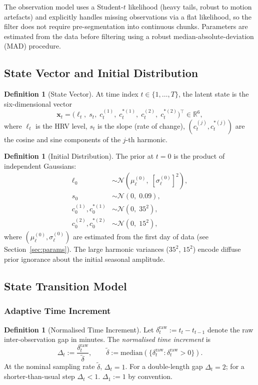 \documentclass[11pt, a4paper]{article}
\theoremstyle{plain}
\theoremstyle{definition}
\newtheorem{definition}[theorem]{Definition}
\newcommand{\R}{\mathbb{R}}
\newcommand{\N}{\mathcal{N}}
\newcommand{\bx}{\mathbf{x}}
\begin{document}
The observation model uses a Student-$t$ likelihood (heavy tails, robust to
motion artefacts) and explicitly handles missing observations via a flat
likelihood, so the filter does not require pre-segmentation into continuous
chunks. Parameters are estimated from the data before filtering using a
robust median-absolute-deviation (MAD) procedure.

\subsection{State Vector and Initial Distribution}

\begin{definition}[State Vector]
At time index $t \in \{1, \ldots, T\}$, the latent state is the
six-dimensional vector
\[
  \bx_t
  = \bigl(\ell_t,\; s_t,\; c_t^{(1)},\; c_t^{*(1)},\; c_t^{(2)},\; c_t^{*(2)}\bigr)^\top
  \in \R^6,
\]
where $\ell_t$ is the HRV level, $s_t$ is the slope (rate of change),
$(c_t^{(j)}, c_t^{*(j)})$ are the cosine and sine components of the $j$-th
harmonic.
\end{definition}

\begin{definition}[Initial Distribution]
The prior at $t = 0$ is the product of independent Gaussians:
\begin{align*}
  \ell_0 &\sim \N(\mu_\ell^{(0)},\; [\sigma_\ell^{(0)}]^2),\\
  s_0    &\sim \N(0,\; 0.09),\\
  c_0^{(1)}, c_0^{*(1)} &\sim \N(0,\; 35^2),\\
  c_0^{(2)}, c_0^{*(2)} &\sim \N(0,\; 15^2),
\end{align*}
where $(\mu_\ell^{(0)}, \sigma_\ell^{(0)})$ are estimated from the first
day of data (see Section~\ref{sec:params}). The large harmonic variances
($35^2$, $15^2$) encode diffuse prior ignorance about the initial seasonal
amplitude.
\end{definition}

\subsection{State Transition Model}

\subsubsection{Adaptive Time Increment}

\begin{definition}[Normalised Time Increment]
Let $\delta_t^{\mathrm{raw}} := t_t - t_{t-1}$ denote the raw inter-observation
gap in minutes. The \emph{normalised time increment} is
\[
  \Delta_t := \frac{\delta_t^{\mathrm{raw}}}{\tilde\delta},
  \qquad \tilde\delta := \mathrm{median}\!\left(\{\delta_t^{\mathrm{raw}} : \delta_t^{\mathrm{raw}} > 0\}\right).
\]
At the nominal sampling rate $\tilde\delta$, $\Delta_t = 1$. For a double-length
gap $\Delta_t = 2$; for a shorter-than-usual step $\Delta_t < 1$.
$\Delta_1 := 1$ by convention.
\end{definition}
\end{document}
